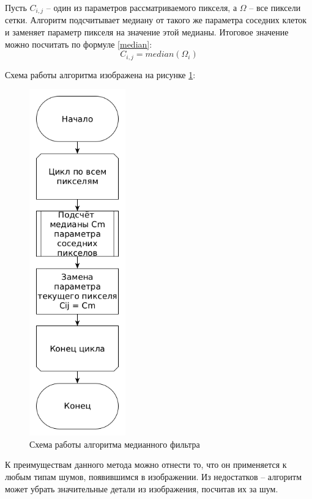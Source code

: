 Пусть $C_{i, j}$ -- один из параметров рассматриваемого пикселя, а $\Omega$ -- все пиксели сетки.
Алгоритм подсчитывает медиану от такого же параметра соседних клеток и заменяет параметр пикселя на значение этой медианы.
Итоговое значение можно посчитать по формуле \ref{median}: 
\begin{equation}
	\label{median}
	C_{i, j} = median(\Omega_i) 
\end{equation}

Схема работы алгоритма изображена на рисунке \ref{fig::median}:
\FloatBarrier
\begin{figure}[h]	
	\begin{center}
		\includegraphics[height=15cm]{inc/png/median.png}
	\end{center}
	\captionsetup{justification=centering}
	\caption{Схема работы алгоритма медианного фильтра}
	\label{fig::median}
\end{figure}
\FloatBarrier

К преимуществам данного метода можно отнести то, что он применяется к любым типам шумов, появившимся в изображении.
Из недостатков -- алгоритм может убрать значительные детали из изображения, посчитав их за шум. 

